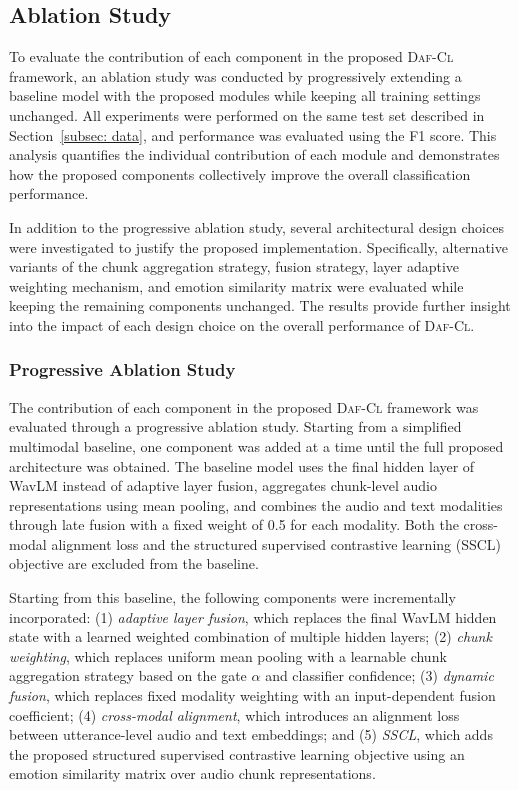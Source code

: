 \subsection{Ablation Study}

To evaluate the contribution of each component in the proposed \textsc{Daf-Cl} framework, an ablation study was conducted by progressively extending a baseline model with the proposed modules while keeping all training settings unchanged. All experiments were performed on the same test set described in Section~\ref{subsec: data}, and performance was evaluated using the F1 score. This analysis quantifies the individual contribution of each module and demonstrates how the proposed components collectively improve the overall classification performance.

In addition to the progressive ablation study, several architectural design choices were investigated to justify the proposed implementation. Specifically, alternative variants of the chunk aggregation strategy, fusion strategy, layer adaptive weighting mechanism, and emotion similarity matrix were evaluated while keeping the remaining components unchanged. The results provide further insight into the impact of each design choice on the overall performance of \textsc{Daf-Cl}.

\subsubsection{Progressive Ablation Study}

The contribution of each component in the proposed \textsc{Daf-Cl} framework was evaluated through a progressive ablation study. Starting from a simplified multimodal baseline, one component was added at a time until the full proposed architecture was obtained. The baseline model uses the final hidden layer of WavLM instead of adaptive layer fusion, aggregates chunk-level audio representations using mean pooling, and combines the audio and text modalities through late fusion with a fixed weight of 0.5 for each modality. Both the cross-modal alignment loss and the structured supervised contrastive learning (SSCL) objective are excluded from the baseline.

Starting from this baseline, the following components were incrementally incorporated: (1) \textit{adaptive layer fusion}, which replaces the final WavLM hidden state with a learned weighted combination of multiple hidden layers; (2) \textit{chunk weighting}, which replaces uniform mean pooling with a learnable chunk aggregation strategy based on the gate $\alpha$ and classifier confidence; (3) \textit{dynamic fusion}, which replaces fixed modality weighting with an input-dependent fusion coefficient; (4) \textit{cross-modal alignment}, which introduces an alignment loss between utterance-level audio and text embeddings; and (5) \textit{SSCL}, which adds the proposed structured supervised contrastive learning objective using an emotion similarity matrix over audio chunk representations.

